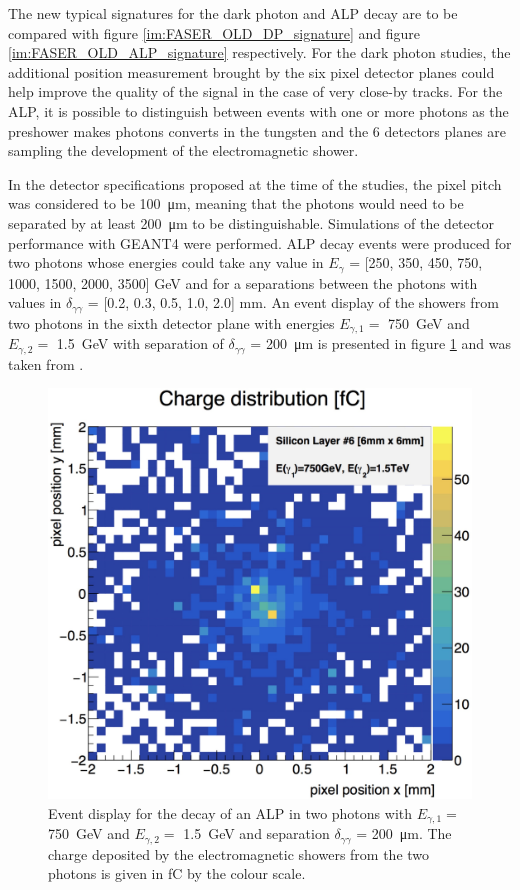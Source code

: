 		The new typical signatures for the dark photon and ALP decay are to be compared with figure \ref{im:FASER_OLD_DP_signature} and figure \ref{im:FASER_OLD_ALP_signature} respectively. For the dark photon studies, the additional position measurement brought by the six pixel detector planes could help improve the quality of the signal in the case of very close-by tracks. For the ALP, it is possible to distinguish between events with one or more photons as the preshower makes photons converts in the tungsten and the 6 detectors planes are sampling the development of the electromagnetic shower. 
 		  
		In the detector specifications proposed at the time of the studies, the pixel pitch was considered to be \SI{100}{\micro\meter}, meaning that the photons would need to be separated by at least \SI{200}{\micro\meter} to be distinguishable. Simulations of the detector performance with GEANT4 were performed. ALP decay events were produced for two photons whose energies could take any value in $E_\gamma$ = [250, 350, 450, 750, 1000, 1500, 2000, 3500] GeV and for a separations between the photons with values in $\delta_{\gamma\gamma}$ = [0.2, 0.3, 0.5, 1.0, 2.0] mm. An event display of the showers from two photons in the sixth detector plane with energies $E_{\gamma,1} =$ \SI{750}{\giga\electronvolt} and $E_{\gamma,2} =$ \SI{1.5}{\giga\electronvolt} with separation of $\delta_{\gamma\gamma}$ = \SI{200}{\micro\meter} is presented in figure \ref{im:di-photon_event_GEANT4} and was taken from \cite{PreShower_TP}. 
		
		\begin{figure}[h]
			\centering
			\includegraphics[width=0.7\linewidth]{files/di-photon_event_GEANT4}
			\caption{Event display for the decay of an ALP in two photons with $E_{\gamma,1} =$ \SI{750}{\giga\electronvolt} and $E_{\gamma,2} =$ \SI{1.5}{\giga\electronvolt} and separation $\delta_{\gamma\gamma}$ = \SI{200}{\micro\meter}. The charge deposited by the electromagnetic showers from the two photons is given in fC by the colour scale.}
			\label{im:di-photon_event_GEANT4}
		\end{figure}
		
